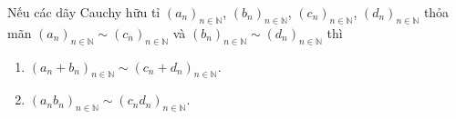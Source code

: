 \begin{appendixthm}\label{appendixthm:basis-of-equivalence-class-of-rational-cauchy-sequences-addition}
    Nếu các dãy Cauchy hữu tỉ ${(a_{n})}_{n\in\mathbb{N}}$, ${(b_{n})}_{n\in\mathbb{N}}$, ${(c_{n})}_{n\in\mathbb{N}}$, ${(d_{n})}_{n\in\mathbb{N}}$ thỏa mãn ${(a_{n})}_{n\in\mathbb{N}}\sim {(c_{n})}_{n\in\mathbb{N}}$ và ${(b_{n})}_{n\in\mathbb{N}}\sim {(d_{n})}_{n\in\mathbb{N}}$ thì
    \begin{enumerate}[label={(\roman*)}]
        \item ${(a_{n} + b_{n})}_{n\in\mathbb{N}} \sim {(c_{n} + d_{n})}_{n\in\mathbb{N}}$.
        \item ${(a_{n}b_{n})}_{n\in\mathbb{N}} \sim {(c_{n}d_{n})}_{n\in\mathbb{N}}$.
    \end{enumerate}
\end{appendixthm}

